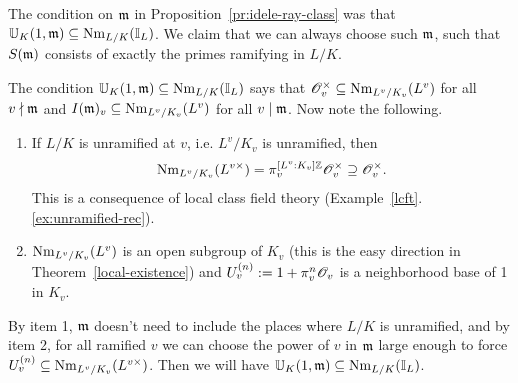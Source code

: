 \begin{rem}
The condition on $\mathfrak{m}$ in Proposition~\ref{pr:idele-ray-class} was that $\mathbb U_K(1,\mathfrak{m})\subseteq \operatorname{Nm}_{L/K}(\mathbb{I}_L)$. We claim that we can always choose such $\mathfrak{m}$, such that $S(\mathfrak{m})$ consists of exactly the primes ramifying in $L/K$.

The condition $\mathbb U_K(1,\mathfrak{m})\subseteq \operatorname{Nm}_{L/K}(\mathbb{I}_L)$ says that $\mathscr{O}_v^{\times}\subseteq \operatorname{Nm}_{L^v/K_v}(L^v)$ for all $v\nmid \mathfrak{m}$ and 
$I(\mathfrak{m})_v\subseteq \operatorname{Nm}_{L^v/K_v}(L^v)$ for all $v\mid \mathfrak{m}$. Now note the following.
\begin{enumerate}
\item If $L/K$ is unramified at $v$, i.e. $L^v/K_v$ is unramified, then
\[
\operatorname{Nm}_{L^v/K_v}(L^{v\times})=\pi_v^{[L^v:K_v]\mathbb{Z}}\mathscr{O}_v^{\times}\supseteq \mathscr{O}_v^{\times}.
\]
This is a consequence of local class field theory (Example~\ref{lcft}.\ref{ex:unramified-rec}).
\item $\operatorname{Nm}_{L^v/K_v}(L^v)$ is an open subgroup of $K_v$ (this is the easy direction in Theorem~\ref{local-existence}) and $U_v^{(n)}:=1+\pi_v^n\mathscr{O}_v$ is a neighborhood base of 1 in $K_v$.
\end{enumerate}
By item 1, $\mathfrak{m}$ doesn't need to include the places where $L/K$ is unramified, and by item 2, for all ramified $v$ we can choose the power of $v$ in $\mathfrak{m}$ large enough to force $U_v^{(n)}\subseteq \operatorname{Nm}_{L^v/K_v}(L^{v\times})$. Then we will have $\mathbb U_K(1,\mathfrak{m})\subseteq \operatorname{Nm}_{L/K}(\mathbb{I}_L)$.
\end{rem}
